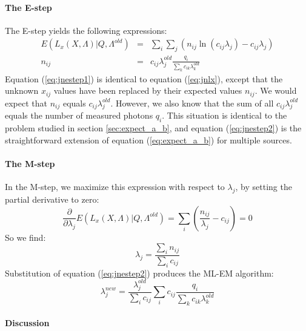 \paragraph{The E-step\\}
The E-step yields the following expressions:
\begin{align}
E(L_x(X, \Lambda) | Q, \Lambda^{old}) & = & 
   \sum_i \sum_j ( n_{ij} \ln (c_{ij} \lambda_j) -  c_{ij} \lambda_j)
   \label{eq:jnestep1}\\
n_{ij} & = & c_{ij} \lambda_j^{old} \frac{q_i}{\sum_k c_{ik} \lambda_k^{old}}
   \label{eq:jnestep2}
\end{align}
Equation (\ref{eq:jnestep1}) is identical to equation (\ref{eq:jnlx}), except
that the unknown $x_{ij}$ values have been replaced by their expected values
$n_{ij}$. We would expect that $n_{ij}$ equals $c_{ij}
\lambda_j^{old}$. However, we also know that the sum of all $c_{ij}
\lambda_j^{old}$ equals the number of measured photons $q_i$. This situation
is identical to the problem studied in section \ref{sec:expect_a_b}, and 
equation (\ref{eq:jnestep2}) is the straightforward extension of equation
(\ref{eq:expect_a_b}) for multiple sources.

\paragraph{The M-step\\}
In the M-step, we maximize this expression with respect to $\lambda_j$, by
setting the partial derivative to zero:
\begin{equation}
\frac{\partial}{\partial \lambda_j} E(L_x(X, \Lambda) | Q, \Lambda^{old})
   =  \sum_i \left( \frac{n_{ij}}{\lambda_j} - c_{ij} \right) = 0
\end{equation}
So we find:
\begin{equation}
 \lambda_j  =  \frac{\sum_i n_{ij}}{\sum_i c_{ij}} \label{eq:jnmstep}
\end{equation}
Substitution of equation (\ref{eq:jnestep2}) produces the ML-EM
algorithm:
\begin{equation}
  \lambda_j^{new}  =  \frac{\lambda_j^{old}}{\sum_i c_{ij}}
           \sum_i c_{ij}  \frac{q_i}{\sum_k c_{ik} \lambda_k^{old}}
           \label{eq:jnmlem}
\end{equation}

\paragraph{Discussion\\}

